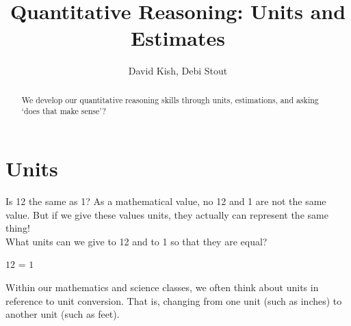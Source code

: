 \documentclass{ximera}
\author{David Kish, Debi Stout}
\title{Quantitative Reasoning: Units and Estimates}
\begin{document}
\licenseAPC
\begin{abstract}
We develop our quantitative reasoning skills through units, estimations, and asking `does that make sense'?
\end{abstract}
\maketitle




\section{Units}

Is 12 the same as 1?  As a mathematical value, no 12 and 1 are not the same value.  But if we give these values units, they actually can represent the same thing! \\
What units can we give to 12 and to 1 so that they are equal? 

\begin{center}
$12$   = $1$  
\end{center}


Within our mathematics and science classes, we often think about units in reference to unit conversion. That is, changing from one unit (such as inches) to another unit (such as feet). 
\end{document}
